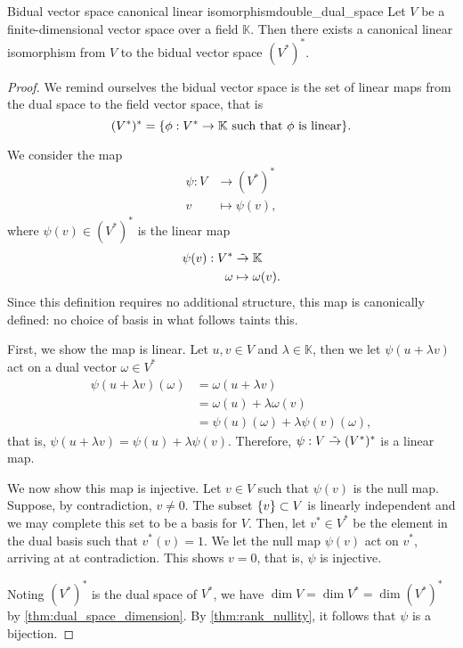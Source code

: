 \begin{theorem}{Bidual vector space canonical linear isomorphism}{double_dual_space}
    Let \(V\) be a finite-dimensional vector space over a field \(\mathbb{K}\). Then there exists a canonical linear isomorphism from \(V\) to the bidual vector space \((V^{\ast})^{\ast}\).
\end{theorem}
\begin{proof}
    We remind ourselves the bidual vector space is the set of linear maps from the dual space to the field vector space, that is
    \begin{equation*}
        (V^{\ast})^{\ast} = \set*{\phi : V^{\ast}\to \mathbb{K}\text{ such that }\phi\text{ is linear}}.
    \end{equation*}

    We consider the map
    \begin{align*}
        \psi : V &\to (V^{\ast})^{\ast}\\
        v &\mapsto \psi(v),
    \end{align*}
    where \(\psi(v) \in (V ^{\ast})^{\ast}\) is the linear map
    \begin{align*}
        \psi(v) : V^{\ast} &\mathrel{\tilde{\to}} \mathbb{K}\\
        \omega & \mapsto \omega(v).
    \end{align*}
    Since this definition requires no additional structure, this map is canonically defined: no choice of basis in what follows taints this.

    First, we show the map is linear. Let \(u, v \in V\) and \(\lambda \in \mathbb{K}\), then we let \(\psi(u + \lambda v)\) act on a dual vector \(\omega\in V^{\ast}\)
    \begin{align*}
        \psi(u + \lambda v)(\omega) &= \omega(u + \lambda v)\\
                                    &= \omega(u) + \lambda \omega(v)\\
                                    &= \psi(u)(\omega) + \lambda \psi(v)(\omega),
    \end{align*}
    that is, \(\psi(u + \lambda v) = \psi(u) + \lambda \psi(v)\). Therefore, \(\psi : V \mathrel{\tilde{\to}} (V ^{\ast})^{\ast} \) is a linear map.

    We now show this map is injective. Let \(v \in V\) such that \(\psi(v)\) is the null map. Suppose, by contradiction, \(v \neq 0\). The subset \(\{v\}\subset V\) is linearly independent and we may complete this set to be a basis for \(V\). Then, let \(v ^{\ast} \in V ^{\ast}\) be the element in the dual basis such that \(v ^{\ast}(v) = 1\). We let the null map \(\psi(v)\) act on \(v ^{\ast}\), arriving at at contradiction. This shows \(v = 0\), that is, \(\psi\) is injective.

    Noting \((V ^{\ast})^{\ast}\) is the dual space of \(V ^{\ast}\), we have \(\dim V = \dim V ^{\ast} = \dim (V^{\ast})^{\ast}\) by \cref{thm:dual_space_dimension}. By \cref{thm:rank_nullity}, it follows that \(\psi\) is a bijection.
\end{proof}
